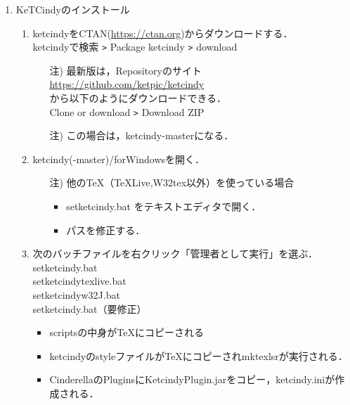 \documentclass{ujarticle}
\begin{document}
\begin{enumerate}[\bf\large 1.]
\item KeTCindyのインストール
  \begin{enumerate}[(1)]
  \item ketcindyをCTAN(\url{https://ctan.org})からダウンロードする．\\
  \hspace*{10mm}ketcindyで検索 \verb|>| Package ketcindy \verb|>| download
    \begin{itemize}
    \item[注)]最新版は，Repositoryのサイト\\
        \hspace*{10mm}\url{https://github.com/ket­pic/ketcindy}\\
       から以下のようにダウンロードできる．\\
        \hspace*{10mm}Clone or download \verb|>| Download ZIP
    \item[注)]この場合は，ketcindy-masterになる．
    \end{itemize}
  \item ketcindy(-master)/forWindowsを開く．
    \begin{itemize}
    \item[注)]他のTeX（TeXLive,W32tex以外）を使っている場合
      \begin{itemize}
      \item setketcindy.bat をテキストエディタで開く．
      \item パスを修正する．
      \end{itemize}
    \end{itemize}
  \item 次のバッチファイルを右クリック「管理者として実行」を選ぶ．\\
  \hspace*{3zw} setketcindy.bat\\
  \hspace*{3zw} setketcindytexlive.bat\\
  \hspace*{3zw} setketcindyw32J.bat\\
  \hspace*{3zw} setketcindy.bat（要修正）
   \begin{itemize}
    \item scriptsの中身がTeXにコピーされる
    \item ketcindyのstyleファイルがTeXにコピーされmktexlsrが実行される．
    \item CinderellaのPluginsにKetcindyPlugin.jarをコピー，ketcindy.iniが作成される．

\end{itemize}
\end{enumerate}
\end{enumerate}
\end{document}
